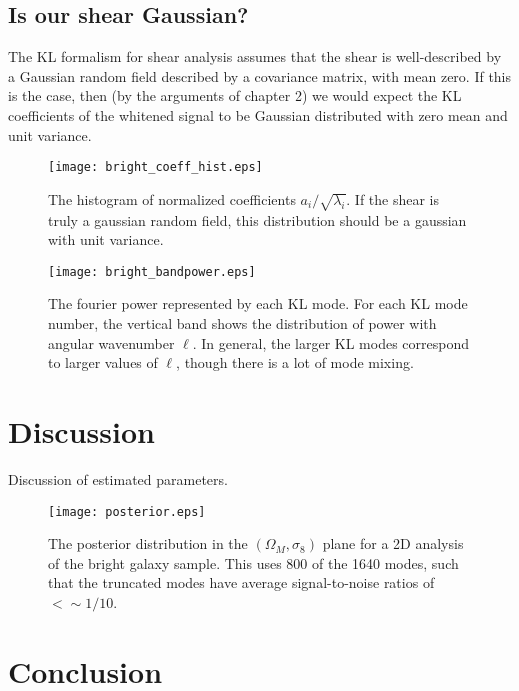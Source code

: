 \subsection{Is our shear Gaussian?}
The KL formalism for shear analysis assumes that the shear is well-described
by a Gaussian random field described by a covariance matrix, with mean
zero.  If this is the case, then (by the arguments of chapter 2) we would
expect the KL coefficients of the whitened signal to be Gaussian distributed
with zero mean and unit variance.

\begin{figure*}
 \centering
 \texttt{[image: bright\_coeff\_hist.eps]}
 \caption{
   The histogram of normalized coefficients $a_i / \sqrt{\lambda_i}$.
   If the shear is truly a gaussian random field, this distribution should
   be a gaussian with unit variance.
   \label{fig:coeff_hist}}
\end{figure*}

\begin{figure*}
 \centering
 \texttt{[image: bright\_bandpower.eps]}
 \caption{
   The fourier power represented by each KL mode.  For each KL mode number,
   the vertical band shows the distribution of power with angular wavenumber
   $\ell$.  In general, the larger KL modes correspond to larger values of
   $\ell$, though there is a lot of mode mixing.
   \label{fig:bandpower}}
\end{figure*}

\section{Discussion}
\label{sec:discussion}
Discussion of estimated parameters.

\begin{figure*}
 \centering
 \texttt{[image: posterior.eps]}
 \caption{The posterior distribution in the $(\Omega_M, \sigma_8)$ plane
   for a 2D analysis of the bright galaxy sample.  This uses 800 of the
   1640 modes, such that the truncated modes have average signal-to-noise
   ratios of $<\sim 1/10$.}
 \label{fig:posterior}
\end{figure*}

\section{Conclusion}
\label{sec:conclusion}
